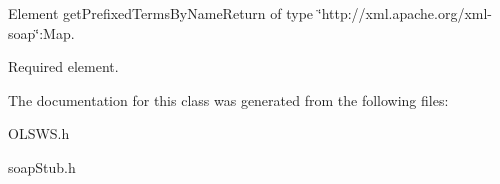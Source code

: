 Element getPrefixedTermsByNameReturn of type \char`\"{}http://xml.apache.org/xml-\/soap\char`\"{}:Map. 

Required element. 

The documentation for this class was generated from the following files:\begin{DoxyCompactItemize}
\item 
OLSWS.h\item 
soapStub.h\end{DoxyCompactItemize}

